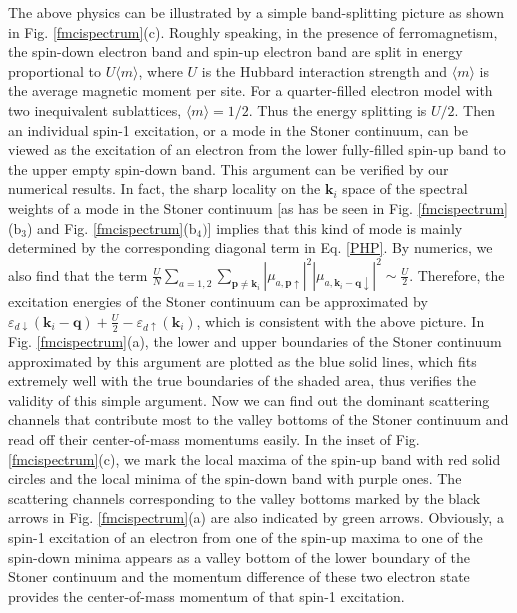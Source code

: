 \documentclass[amsmath,superscriptaddress,showpacs,aps,prb,twocolumn]{revtex4-1}
\begin{document}
\par The above physics can be illustrated by a simple band-splitting picture as shown in Fig. \ref{fmcispectrum}(c). Roughly speaking, in the presence of ferromagnetism, the spin-down electron band and spin-up electron band are split in energy proportional to $U\langle m \rangle$, where $U$ is the Hubbard interaction strength and $\langle m \rangle$ is the average magnetic moment per site. For a quarter-filled electron model with two inequivalent sublattices, $\langle m \rangle=1/2$. Thus the energy splitting is $U/2$. Then an individual spin-1 excitation, or a mode in the Stoner continuum, can be viewed as the excitation of an electron from the lower fully-filled spin-up band to the upper empty spin-down band. This argument can be verified by our numerical results. In fact, the sharp locality on the $\mathbf{k}_i$ space of the spectral weights of a mode in the Stoner continuum [as has be seen in Fig. \ref{fmcispectrum}($\text{b}_3$) and Fig. \ref{fmcispectrum}($\text{b}_4)$] implies that this kind of mode is mainly determined by the corresponding diagonal term in Eq. \ref{PHP}. By numerics, we also find that the term $\frac{U}{N} \sum_{a=1,2} \sum_{\mathbf{p}\neq\mathbf{k}_i} \left| \mu_{a,\mathbf{p}\uparrow} \right|^2 \left| \mu_{a,\mathbf{k}_{i}-\mathbf{q}\downarrow} \right|^2 \sim \frac{U}{2}$. Therefore, the excitation energies of the Stoner continuum can be approximated by $\varepsilon_{d\downarrow} (\mathbf{k}_i-\mathbf{q}) + \frac{U}{2} -\varepsilon_{d\uparrow} (\mathbf{k}_i)$, which is consistent with the above picture. In Fig. \ref{fmcispectrum}(a), the lower and upper boundaries of the Stoner continuum approximated by this argument are plotted as the blue solid lines, which fits extremely well with the true boundaries of the shaded area, thus verifies the validity of this simple argument. Now we can find out the dominant scattering channels that contribute most to the valley bottoms of the Stoner continuum and read off their center-of-mass momentums easily. In the inset of Fig. \ref{fmcispectrum}(c), we mark the local maxima of the spin-up band with red solid circles and the local minima of the spin-down band with purple ones. The scattering channels corresponding to the valley bottoms marked by the black arrows in Fig. \ref{fmcispectrum}(a) are also indicated by green arrows. Obviously, a spin-1 excitation of an electron from one of the spin-up maxima to one of the spin-down minima appears as a valley bottom of the lower boundary of the Stoner continuum and the momentum difference of these two electron state provides the center-of-mass momentum of that spin-1 excitation.
\end{document}
